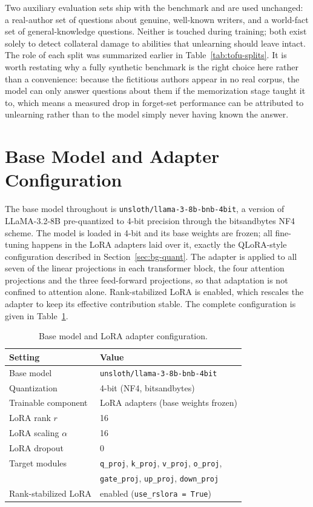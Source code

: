 \documentclass[a4paper,12pt]{report}
\begin{document}
Two auxiliary evaluation sets ship with the benchmark and are used unchanged: a real-author set of questions about genuine, well-known writers, and a world-fact set of general-knowledge questions. Neither is touched during training; both exist solely to detect collateral damage to abilities that unlearning should leave intact. The role of each split was summarized earlier in Table~\ref{tab:tofu-splits}. It is worth restating why a fully synthetic benchmark is the right choice here rather than a convenience: because the fictitious authors appear in no real corpus, the model can only answer questions about them if the memorization stage taught it to, which means a measured drop in forget-set performance can be attributed to unlearning rather than to the model simply never having known the answer.

\section{Base Model and Adapter Configuration}
The base model throughout is \texttt{unsloth/llama-3-8b-bnb-4bit}, a version of LLaMA-3.2-8B pre-quantized to 4-bit precision through the bitsandbytes NF4 scheme. The model is loaded in 4-bit and its base weights are frozen; all fine-tuning happens in the LoRA adapters laid over it, exactly the QLoRA-style configuration described in Section~\ref{sec:bg-quant}. The adapter is applied to all seven of the linear projections in each transformer block, the four attention projections and the three feed-forward projections, so that adaptation is not confined to attention alone. Rank-stabilized LoRA is enabled, which rescales the adapter to keep its effective contribution stable. The complete configuration is given in Table~\ref{tab:model-config}.

\begin{table}[htbp]
	\centering
	\caption{Base model and LoRA adapter configuration.}
	\label{tab:model-config}
	\begin{tabular}{l l}
		\toprule
		\textbf{Setting} & \textbf{Value} \\
		\midrule
		Base model & \texttt{unsloth/llama-3-8b-bnb-4bit} \\
		Quantization & 4-bit (NF4, bitsandbytes) \\
		Trainable component & LoRA adapters (base weights frozen) \\
		LoRA rank $r$ & 16 \\
		LoRA scaling $\alpha$ & 16 \\
		LoRA dropout & 0 \\
		Target modules & \texttt{q\_proj}, \texttt{k\_proj}, \texttt{v\_proj}, \texttt{o\_proj}, \\
		& \texttt{gate\_proj}, \texttt{up\_proj}, \texttt{down\_proj} \\
		Rank-stabilized LoRA & enabled (\texttt{use\_rslora = True}) \\
		\bottomrule
	\end{tabular}
\end{table}
\end{document}

